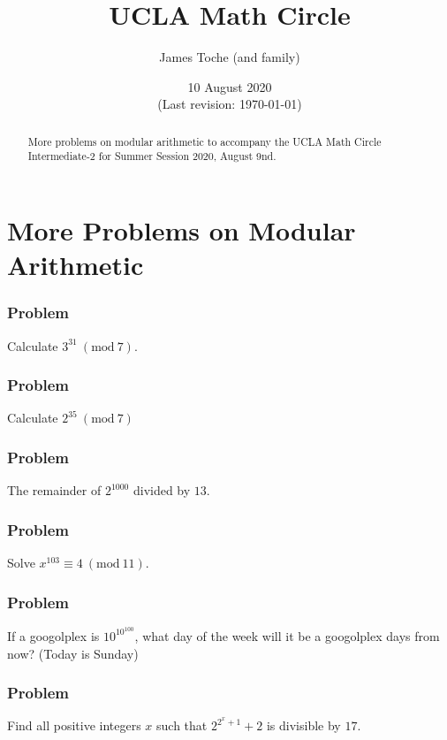\documentclass[12pt]{article}
\title{UCLA Math Circle}
\author{James Toche (and family)}
\date{10 August 2020 \\(Last revision: \today)}
\newcommand{\modulo}[1]{~(\mathrm{mod}~#1)}
\begin{document}
\begin{minipage}{\textwidth}
\maketitle
\begin{abstract}
More problems on modular arithmetic to accompany the UCLA Math Circle Intermediate-2 for Summer Session 2020, August 9nd. 
\end{abstract}
\end{minipage}

\section*{More Problems on Modular Arithmetic}

\subsubsection{Problem}
\begin{question}
Calculate $3^{31}\modulo{7}$. 
\end{question}


\subsubsection{Problem}
\begin{question}
Calculate $2^{35}\modulo{7}$
\end{question}


\subsubsection{Problem}
\begin{question}
The remainder of $2^{1000}$ divided by $13$.
\end{question}



\subsubsection{Problem}
\begin{question}
Solve $x^{103} \equiv 4\modulo{11}$. 
\end{question}


\subsubsection{Problem}
\begin{question}
If a googolplex is $10^{10^{100}}$, what day of the week will it be a googolplex days from now? (Today is Sunday)
\end{question}



\subsubsection{Problem}
\begin{question}
Find all positive integers $x$ such that $2^{2^{x}+1}+2$ is divisible by $17$.
\end{question}
\end{document}
